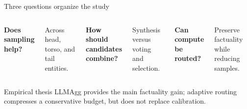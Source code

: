 \documentclass[aspectratio=169,10pt]{beamer}
\newcommand{\LLMAgg}{\textsf{LLMAgg}}
\begin{document}
\begin{frame}{Three questions organize the study}
  \begin{columns}[T,onlytextwidth]
  \color{ink}
      \centering
      {\color{positive}\fontsize{34}{38}}\par\vspace{2pt}
      \textbf{Does sampling help?}\par\vspace{3pt}
      \small Across head, torso, and tail entities.
      \centering
      {\color{emphasis}\fontsize{34}{38}}\par\vspace{2pt}
      \textbf{How should candidates combine?}\par\vspace{3pt}
      \small Synthesis versus voting and selection.
      \centering
      {\color{negative}\fontsize{34}{38}}\par\vspace{2pt}
      \textbf{Can compute be routed?}\par\vspace{3pt}
      \small Preserve factuality while reducing samples.
  \end{columns}
  \vfill
  \begin{block}{Empirical thesis}
    \centering
    \large \LLMAgg{} provides the main factuality gain; adaptive routing compresses a conservative budget, but does not replace calibration.
  \end{block}
\end{frame}
\end{document}
